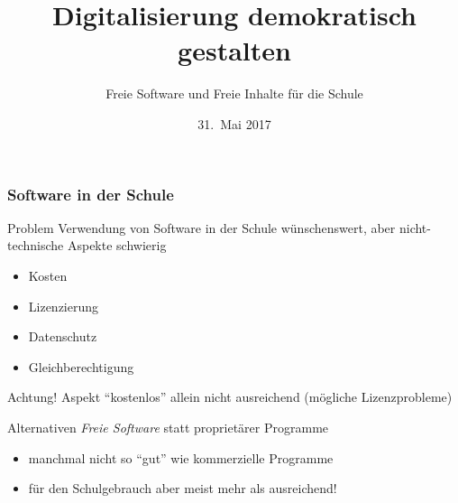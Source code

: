 \documentclass{beamer}
\date{31.~Mai 2017}
\begin{document}
\title{Digitalisierung demokratisch gestalten}
\subtitle{Freie Software und Freie Inhalte für die Schule}

\maketitle

\begin{frame}
  \frametitle{Software in der Schule}

  \onslide<+->

  \begin{block}{Problem}
    Verwendung von Software in der Schule wünschenswert, aber
    nicht-technische Aspekte schwierig
    \begin{itemize}
    \item Kosten
    \item Lizenzierung
    \item Datenschutz
    \item Gleichberechtigung
    \end{itemize}
  \end{block}

  \onslide<+->

  \begin{block}{Achtung!}
    Aspekt \enquote{kostenlos} allein nicht ausreichend (mögliche
    Lizenzprobleme)
  \end{block}

  \onslide<+->

  \begin{block}{Alternativen}
    \emph{Freie Software} statt proprietärer Programme
    \begin{itemize}
    \item manchmal nicht so \enquote{gut} wie kommerzielle Programme
    \item für den Schulgebrauch aber meist mehr als ausreichend!
    \end{itemize}
  \end{block}

\end{frame}
\end{document}

